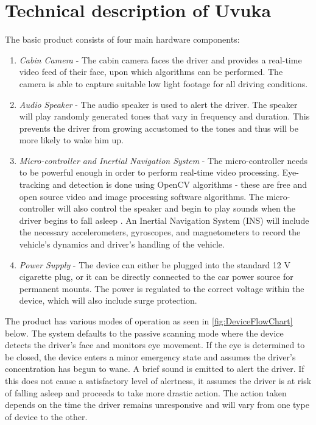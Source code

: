 \section{Technical description of Uvuka}
\label{sec:Technical description of Uvuka}
The basic product consists of four main hardware components:
\begin{enumerate}
  \item \textit{Cabin Camera} - The cabin camera faces the driver and provides a real-time video feed of their face, upon which algorithms can be performed. The camera is able to capture suitable low light footage for all driving conditions.
  \item \textit{Audio Speaker} - The audio speaker is used to alert the driver. The speaker will play randomly generated tones that vary in frequency and duration. This prevents the driver from growing accustomed to the tones and thus will be more likely to wake him up\cite{Habituation}.
  \item \textit{Micro-controller and Inertial Navigation System} - The micro-controller needs to be powerful enough in order to perform real-time video processing. Eye-tracking and detection is done using OpenCV algorithms - these are free and open source video and image processing software algorithms. The micro-controller will also control the speaker and begin to play sounds when the driver begins to fall asleep \cite{OpenCV}. An Inertial Navigation System (INS) will include the necessary accelerometers, gyroscopes, and magnetometers to record the vehicle's dynamics and driver's handling of the vehicle.
  \item \textit{Power Supply} - The device can either be plugged into the standard 12 V cigarette plug, or it can be directly connected to the car power source for permanent mounts. The power is regulated to the correct voltage within the device, which will also include surge protection.
\end{enumerate}

The product has various modes of operation as seen in \cref{fig:DeviceFlowChart} below. The system defaults to the passive scanning mode where the device detects the driver's face and monitors eye movement. If the eye is determined to be closed, the device  enters a minor emergency state and assumes the driver's concentration has begun to wane. A brief sound is emitted to alert the driver. If this does not cause a satisfactory level of alertness, it assumes the driver is at risk of falling asleep and proceeds to take more drastic action. The action taken depends on the time the driver remains unresponsive and will vary from one type of device to the other.

